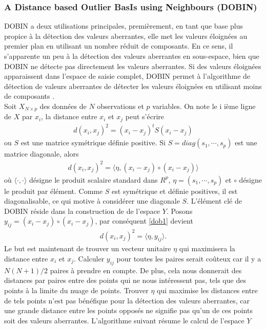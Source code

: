 \subsubsection*{A Distance based Outlier BasIs using Neighbours (DOBIN)}
 DOBIN a deux utilisations principales,  premièrement, en tant que base plus propice à la détection des valeurs aberrantes, elle met les valeurs éloignées au premier plan en utilisant un nombre réduit de composants. En ce sens, il s’apparente un peu à la détection des valeurs aberrantes en sous-espace, bien que DOBIN ne détecte pas directement les valeurs aberrantes. Si des valeurs éloignées apparaissent dans l’espace de saisie complet, DOBIN permet à l'algorithme de détection de valeurs aberrantes de détecter les valeurs éloignées en utilisant moins de composants \cite{A7}.  \\
 Soit  $X_{N\times p}$ des données de  $N$ observations et $p$ variables.
 On note le i ième ligne de $X$ par $x_i$, la distance entre  $x_i$ et $x_j$ peut s'écrire
 \begin{align*}
 d(x_i,x_j)^2=(x_i-x_j)^tS(x_i-x_j) 
 \end{align*}
 ou $S$ est une matrice symétrique définie positive. Si $S=diag(s_1,\cdots,s_p)$ est une matrice diagonale, alors
 \begin{align}\label{dob1}
 d(x_i,x_j)^2=\langle\eta,(x_i-x_j)\circ(x_i-x_j) \rangle
 \end{align} 
 où $\langle\cdot{,}\cdot\rangle$ désigne le produit scalaire  standard dans $R^p$, $\eta = (s_1,\cdots,s_p)$ et $\circ$ désigne le produit par élément. Comme $S$ est symétrique et définie positives, il est diagonalisable, ce qui motive à considérer une diagonale $S$. L'élément clé de DOBIN réside dans la construction de de l'espace $Y$.
 Posons $y_{ij}=(x_i-x_j)\circ(x_i-x_j)$, par conséquent \eqref{dob1} devient 
\begin{align}\label{dob2}
d(x_i,x_j)^2=\langle\eta,y_{ij}\rangle.
\end{align}
 Le but est maintenant de trouver un vecteur unitaire $\eta$ qui maximisera la distance entre $x_i$ et $x_j$. Calculer $y_{ij}$ pour toutes les paires serait coûteux car il y a $N (N + 1) / 2$ paires à prendre en compte. De plus, cela nous donnerait des distances par paires entre des points qui ne nous intéressent pas, tels que des points à la limite du nuage de points. Trouver $\eta$ qui maximise les distances entre de tels points n’est pas bénéfique pour la détection des valeurs aberrantes, car une grande distance entre les points opposés ne signifie pas qu’un de ces points soit des valeurs aberrantes. L'algorithme suivant résume le calcul de l'espace $Y$
